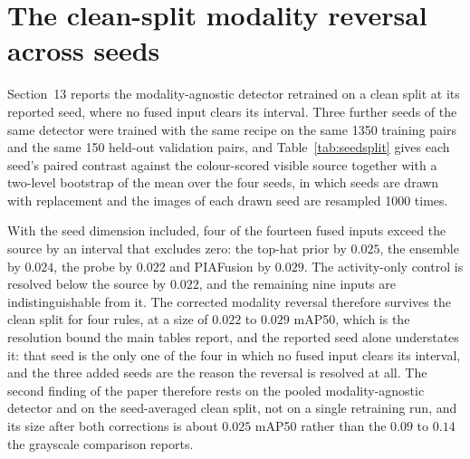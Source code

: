 \documentclass[preprint,12pt,a4paper]{elsarticle}
\begin{document}
\section{The clean-split modality reversal across seeds}

Section~13 reports the modality-agnostic detector retrained on a clean split at its
reported seed, where no fused input clears its interval. Three further seeds of the same
detector were trained with the same recipe on the same 1350 training pairs and the same
150 held-out validation pairs, and Table~\ref{tab:seedsplit} gives each seed's paired
contrast against the colour-scored visible source together with a two-level bootstrap of
the mean over the four seeds, in which seeds are drawn with replacement and the images
of each drawn seed are resampled 1000 times.

With the seed dimension included, four of the fourteen fused inputs exceed the source by
an interval that excludes zero: the top-hat prior by $0.025$, the ensemble by $0.024$,
the probe by $0.022$ and PIAFusion by $0.029$. The activity-only control is resolved
below the source by $0.022$, and the remaining nine inputs are indistinguishable from
it. The corrected modality reversal therefore survives the clean split for four rules,
at a size of $0.022$ to $0.029$ mAP50, which is the resolution bound the main tables
report, and the reported seed alone understates it: that seed is the only one of the
four in which no fused input clears its interval, and the three added seeds are the
reason the reversal is resolved at all. The second finding of the paper therefore rests
on the pooled modality-agnostic detector and on the seed-averaged clean split, not on a
single retraining run, and its size after both corrections is about $0.025$ mAP50
rather than the $0.09$ to $0.14$ the grayscale comparison reports.
\end{document}
